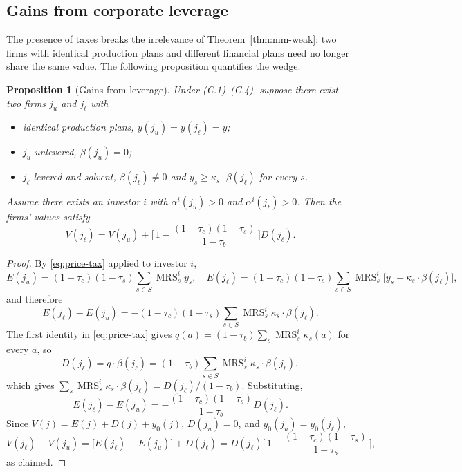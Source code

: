 \documentclass[11pt,a4paper,oneside]{book}
\def\geq{\geqslant}
\DeclareMathOperator{\MRS}{MRS}
\theoremstyle{plain}
\newtheorem{proposition}[theorem]{Proposition}
\theoremstyle{definition}
\theoremstyle{remark}
\numberwithin{equation}{chapter}
\begin{document}
\subsection{Gains from corporate leverage}

The presence of taxes breaks the irrelevance of Theorem~\ref{thm:mm-weak}: two firms with identical production plans and different financial plans need no longer share the same value.
The following proposition quantifies the wedge.

\begin{proposition}[Gains from leverage]\label{prop:gains-leverage}
Under \textup{(C.1)--(C.4)}, suppose there exist two firms $j_u$ and $j_\ell$ with
\begin{itemize}
  \item identical production plans, $y(j_u) = y(j_\ell) = y$;
  \item $j_u$ unlevered, $\beta(j_u) = 0$;
  \item $j_\ell$ levered and solvent, $\beta(j_\ell) \neq 0$ and $y_s \geq \kappa_s \cdot \beta(j_\ell)$ for every $s$.
\end{itemize}
Assume there exists an investor $i$ with $\alpha^i(j_u) > 0$ and $\alpha^i(j_\ell) > 0$.
Then the firms' values satisfy
\begin{equation}\label{eq:gains-leverage}
  V(j_\ell) = V(j_u) + \biggl[\, 1 - \frac{(1-\tau_c)(1-\tau_s)}{1-\tau_b} \,\biggr] D(j_\ell).
\end{equation}
\end{proposition}

\begin{proof}
By \eqref{eq:price-tax} applied to investor $i$,
\begin{equation*}
  E(j_u) = (1-\tau_c)(1-\tau_s) \sum_{s \in S} \MRS^i_s y_s,
  \quad
  E(j_\ell) = (1-\tau_c)(1-\tau_s) \sum_{s \in S} \MRS^i_s \bigl[ y_s - \kappa_s \cdot \beta(j_\ell) \bigr],
\end{equation*}
and therefore
\begin{equation*}
  E(j_\ell) - E(j_u) = - (1-\tau_c)(1-\tau_s) \sum_{s \in S} \MRS^i_s \kappa_s \cdot \beta(j_\ell).
\end{equation*}
The first identity in \eqref{eq:price-tax} gives $q(a) = (1-\tau_b) \sum_s \MRS^i_s \kappa_s(a)$ for every $a$, so
\begin{equation*}
  D(j_\ell) = q \cdot \beta(j_\ell) = (1-\tau_b) \sum_{s \in S} \MRS^i_s \kappa_s \cdot \beta(j_\ell),
\end{equation*}
which gives $\sum_s \MRS^i_s \kappa_s \cdot \beta(j_\ell) = D(j_\ell)/(1-\tau_b)$.
Substituting,
\begin{equation*}
  E(j_\ell) - E(j_u) = - \frac{(1-\tau_c)(1-\tau_s)}{1-\tau_b} D(j_\ell).
\end{equation*}
Since $V(j) = E(j) + D(j) + y_0(j)$, $D(j_u) = 0$, and $y_0(j_u) = y_0(j_\ell)$,
\begin{equation*}
  V(j_\ell) - V(j_u)
  = \bigl[ E(j_\ell) - E(j_u) \bigr] + D(j_\ell)
  = D(j_\ell) \biggl[\, 1 - \frac{(1-\tau_c)(1-\tau_s)}{1-\tau_b} \,\biggr],
\end{equation*}
as claimed.
\end{proof}
\end{document}
